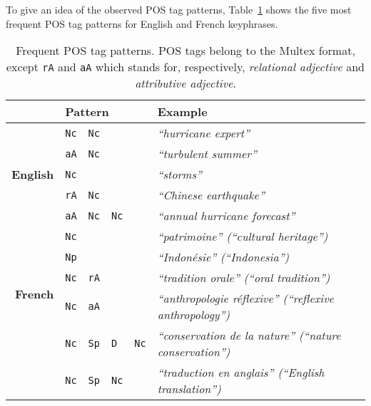     To give an idea of the observed POS tag patterns,
    Table~\ref{tab:best_patterns} shows the five most frequent POS tag patterns
    for English and French keyphrases.
    \begin{table}[h]
      \centering
      \begin{tabular}{r|lllll}
        \toprule
        \multicolumn{1}{r}{} & \multicolumn{4}{l}{\textbf{Pattern}} & \textbf{Example}\\
        \midrule
        \multirow{5}{*}[-2pt]{\begin{sideways}\textbf{English}\end{sideways}} & \verb:Nc: & \verb:Nc: & & & \textit{``hurricane expert''}\\ %
        & \verb:aA: & \verb:Nc: & & & \textit{``turbulent summer''}\\ %
        & \verb:Nc: & & & & \textit{``storms''}\\ %
        & \verb:rA: & \verb:Nc: & & & \textit{``Chinese earthquake''}\\ %
        & \verb:aA: & \verb:Nc: & \verb:Nc: & & \textit{``annual hurricane forecast''}\\ %
        \hline%
        \multirow{5}{*}[-2pt]{\begin{sideways}\textbf{French}\end{sideways}} & \verb:Nc: & & & & \textit{``patrimoine'' (``cultural heritage'')}\\ %
        & \verb:Np: & & & & \textit{``Indonésie'' (``Indonesia'')}\\ %
        & \verb:Nc: & \verb:rA: & & & \textit{``tradition orale'' (``oral tradition'')}\\ %
        & \verb:Nc: & \verb:aA: & & & \textit{``anthropologie réflexive'' (``reflexive anthropology'')}\\ %
        & \verb:Nc: & \verb:Sp: & \verb:D: & \verb:Nc: & \textit{``conservation de la nature'' (``nature conservation'')}\\ %
        & \verb:Nc: & \verb:Sp: & \verb:Nc: & & \textit{``traduction en anglais'' (``English translation'')}\\ %
        \bottomrule
      \end{tabular}
      \caption{Frequent POS tag patterns. POS tags belong to the Multex format,
               except \texttt{rA} and \texttt{aA} which stands for,
               respectively, \textit{relational adjective} and
               \textit{attributive adjective}.
               \label{tab:best_patterns}}
    \end{table}

